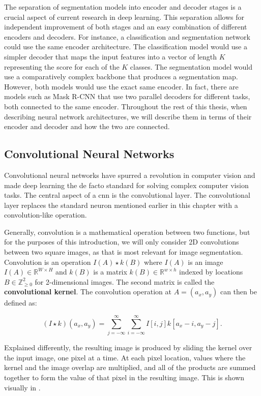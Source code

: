 The separation of segmentation models into encoder and decoder stages is a crucial aspect of current research in deep learning. This separation allows for independent improvement of both stages and an easy combination of different encoders and decoders. For instance, a classification and segmentation network could use the same encoder architecture. The classification model would use a simpler decoder that maps the input features into a vector of length $K$ representing the score for each of the $K$ classes. The segmentation model would use a comparatively complex backbone that produces a segmentation map. However, both models would use the exact same encoder. In fact, there are models such as Mask R-CNN \cite{heMaskRCNN2018} that use two parallel decoders for different tasks, both connected to the same encoder. Throughout the rest of this thesis, when describing neural network architectures, we will describe them in terms of their encoder and decoder and how the two are connected.

\subsection{Convolutional Neural Networks}

Convolutional neural networks have spurred a revolution in computer vision and made deep learning the de facto standard for solving complex computer vision tasks. The central aspect of a \ac{cnn} is the convolutional layer. The convolutional layer replaces the standard neuron mentioned earlier in this chapter with a convolution-like operation.

Generally, convolution is a mathematical operation between two functions, but for the purposes of this introduction, we will only consider 2D convolutions between two square images, as that is most relevant for image segmentation. Convolution is an operation $I(A) \star k(B)$ where $I(A)$ is an image $I(A) \in \mathbb{R}^{W \times H}$ and $k(B)$ is a matrix $k(B) \in \mathbb{R}^{w \times h}$ indexed by locations $B \in \mathbb{Z}_{\geq0}^2$ for 2-dimensional images. The second matrix is called the \textbf{convolutional kernel}. The convolution operation at $A = (a_x, a_y)$ can then be defined as:

\begin{equation}
(I \star k)(a_x, a_y) = \sum_{j=-\infty}^{\infty} \sum_{i=-\infty}^{\infty} I[i, j] k[a_x - i, a_y - j].
\end{equation}
 
Explained differently, the resulting image is produced by sliding the kernel over the input image, one pixel at a time. At each pixel location, values where the kernel and the image overlap are multiplied, and all of the products are summed together to form the value of that pixel in the resulting image. This is shown visually in .


